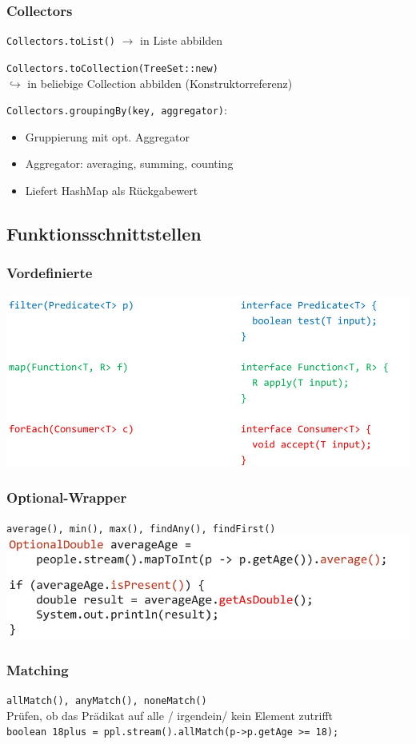 \subsubsection{Collectors}
\verb|Collectors.toList()| $\rightarrow$ in Liste abbilden

\verb|Collectors.toCollection(TreeSet::new)| \\
$\hookrightarrow$ in beliebige Collection abbilden (Konstruktorreferenz)

\verb|Collectors.groupingBy(key, aggregator)|:
\begin{itemize}
    \itemsep0em
    \item Gruppierung mit opt. Aggregator
    \item Aggregator: averaging, summing, counting
    \item Liefert HashMap als Rückgabewert
\end{itemize}

\subsection{Funktionsschnittstellen}
\subsubsection{Vordefinierte}
\includegraphics[width=\linewidth]{pictures/funktionsschnitt-vordef.jpg}

\subsubsection{Optional-Wrapper}
\verb|average(), min(), max(), findAny(), findFirst()| \\
\includegraphics[width=\linewidth]{pictures/optional-wrapper.jpg}

\subsubsection{Matching}
\verb|allMatch(), anyMatch(), noneMatch()| \\
Prüfen, ob das Prädikat auf alle / irgendein/ kein Element zutrifft \\
\verb|boolean 18plus = ppl.stream().allMatch(p->p.getAge >= 18);|